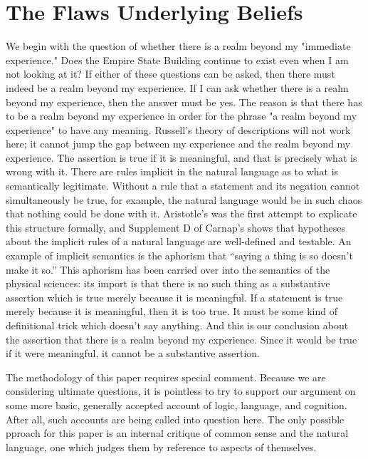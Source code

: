 \chapter{The Flaws Underlying Beliefs}


We begin with the question of whether there is a realm beyond my 
"immediate experience." Does the Empire State Building continue to exist 
even when I am not looking at it? If either of these questions can be asked, 
then there must indeed be a realm beyond my experience. If I can ask 
whether there is a realm beyond my experience, then the answer must be 
yes. The reason is that there has to be a realm beyond my experience in 
order for the phrase "a realm beyond my experience" to have any meaning. 
Russell's theory of descriptions will not work here; it cannot jump the gap 
between my experience and the realm beyond my experience. The assertion 
 is true if it is meaningful, and that 
is precisely what is wrong with it. There are rules implicit in the natural 
language as to what is semantically legitimate. Without a rule that a 
statement and its negation cannot simultaneously be true, for example, the 
natural language would be in such chaos that nothing could be done with it. 
Aristotle's  was the first attempt to explicate this structure formally, 
and Supplement D of Carnap's  shows that hypotheses 
about the implicit rules of a natural language are well-defined and testable. 
An example of implicit semantics is the aphorism that \enquote{saying a thing is so 
doesn't make it so.} This aphorism has been carried over into the semantics 
of the physical sciences: its import is that there is no such thing as a 
substantive assertion which is true merely because it is meaningful. If a 
statement is true merely because it is meaningful, then it is too true. It must 
be some kind of definitional trick which doesn't say anything. And this is 
our conclusion about the assertion that there is a realm beyond my 
experience. Since it would be true if it were meaningful, it cannot be a 
substantive assertion. 

The methodology of this paper requires special comment. Because we 
are considering ultimate questions, it is pointless to try to support our 
argument on some more basic, generally accepted account of logic, language, 
and cognition. After all, such accounts are being called into question here. 
The only possible pproach for this paper is an internal critique of common 
sense and the natural language, one which judges them by reference to 
aspects of themselves. 

